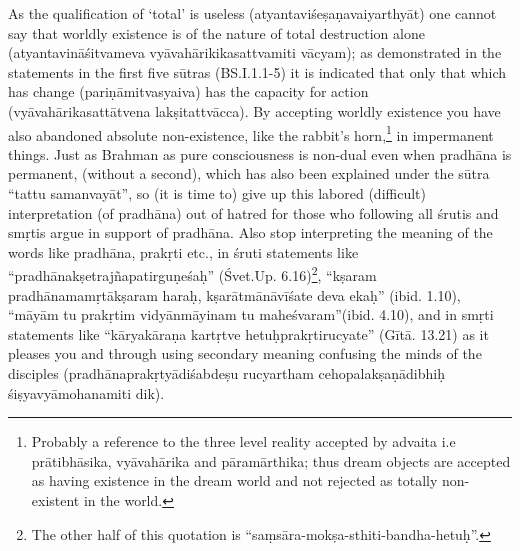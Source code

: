 
\vskip 4pt


\vskip 4pt

As the qualification of ‘total’ is useless (atyantaviśeṣaṇavaiyarthyāt) one cannot say that worldly existence is of the nature of total destruction alone (atyantavināśitvameva vyāvahārikikasattvamiti vācyam); as demonstrated in the statements in the first five sūtras (BS.I.1.1-5) it is indicated that only that which has change (pariṇāmitvasyaiva) has the capacity for action (vyāvahārikasattātvena lakṣitattvācca). By accepting worldly existence you have also abandoned absolute non-existence, like the rabbit’s horn,\footnote{Probably a reference to the three level reality accepted by advaita i.e prātibhāsika, vyāvahārika and pāramārthika; thus dream objects are accepted as having existence in the dream world and not rejected as totally non-existent in the world.} in impermanent things.  Just as Brahman as pure consciousness is non-dual even when pradhāna is permanent, (without a second), which has also been explained under the sūtra “tattu samanvayāt”, so (it is time to) give up this labored (difficult) interpretation (of pradhāna) out of hatred for those who following all śrutis and smṛtis argue in support of pradhāna. Also stop interpreting the meaning of the words like pradhāna, prakṛti etc., in śruti statements like “pradhānakṣetrajñapatirguṇeśaḥ” (Śvet.Up. 6.16)\footnote{The other half of this quotation is “saṃsāra-mokṣa-sthiti-bandha-hetuḥ”.}, “kṣaram pradhānamamṛtākṣaram haraḥ, kṣarātmānāvīśate deva ekaḥ” (ibid. 1.10), “māyām tu prakṛtim vidyānmāyinam tu maheśvaram”(ibid. 4.10), and in smṛti statements like  “kāryakāraṇa kartṛtve hetuḥprakṛti\-rucyate” (Gītā. 13.21) as it pleases you and through using secondary meaning confusing the minds of the disciples (pradhānaprakṛtyādiśabdeṣu rucyartham cehopalakṣaṇādibhiḥ śiṣyavyāmohanamiti dik).

